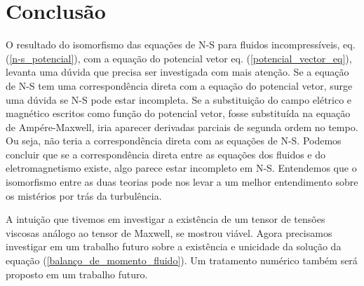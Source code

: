 \chapter[Conclusão]{Conclusão}

O resultado do isomorfismo das equações de N-S para fluidos incompressíveis, eq. (\ref{n-s_potencial}), com a equação do potencial vetor eq. (\ref{potencial_vector_eq}), levanta uma dúvida que precisa ser investigada com mais atenção. Se a equação de N-S tem uma correspondência direta com a equação do potencial vetor, surge uma dúvida se N-S pode estar incompleta. Se a substituição do campo elétrico e magnético escritos como função do potencial vetor, fosse substituída na equação de Ampére-Maxwell, iria aparecer derivadas parciais de segunda ordem no tempo. Ou seja, não teria a correspondência direta com as equações de N-S. Podemos concluir que se a correspondência direta entre as equações dos fluidos e do eletromagnetismo existe, algo parece estar incompleto em N-S. Entendemos que o isomorfismo entre as duas teorias pode nos levar a um melhor entendimento sobre os mistérios por trás da turbulência.

A intuição que tivemos em investigar a existência de um tensor de tensões viscosas análogo ao tensor de Maxwell, se mostrou viável. Agora precisamos investigar em um trabalho futuro sobre a existência e unicidade da solução da equação (\ref{balanço_de_momento_fluido}). Um tratamento numérico também será proposto em um trabalho futuro.